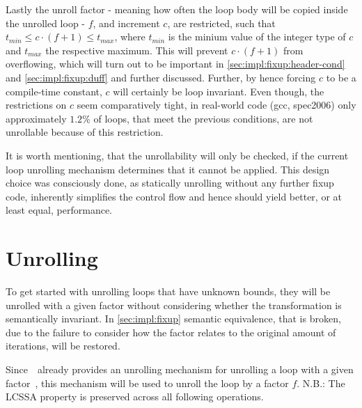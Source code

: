 Lastly the unroll factor - meaning how often the loop body will be copied inside the unrolled loop - $f$, and increment $c$, are restricted, such that $t_{min} \leq c \cdot (f+1) \leq t_{max}$, where $t_{min}$ is the minium value of the integer type of $c$ and $t_{max}$ the respective maximum.
This will prevent $c \cdot (f + 1)$ from overflowing, which will turn out to be important in \cref{sec:impl:fixup:header-cond} and \cref{sec:impl:fixup:duff} and further discussed.
Further, by hence forcing $c$ to be a compile-time constant, $c$ will certainly be loop invariant.
Even though, the restrictions on $c$ seem comparatively tight, in real-world code (gcc, spec2006) only approximately $1.2\%$ of loops, that meet the previous conditions, are not unrollable because of this restriction.

It is worth mentioning, that the unrollability will only be checked, if the current loop unrolling mechanism determines that it cannot be applied.
This design choice was consciously done, as statically unrolling without any further fixup code, inherently simplifies the control flow and hence should yield better, or at least equal, performance.

\section{Unrolling}\label{sec:impl:unroll}

To get started with unrolling loops that have unknown bounds, they will be unrolled with a given factor without considering whether the transformation is semantically invariant.
In \cref{sec:impl:fixup} semantic equivalence, that is broken, due to the failure to consider how the factor relates to the original amount of iterations, will be restored.

Since~\libFIRM~already provides an unrolling mechanism for unrolling a loop with a given factor~\cite{aebi18bachelorarbeit}, this mechanism will be used to unroll the loop by a factor $f$.
N.B.: The LCSSA property is preserved across all following operations.

